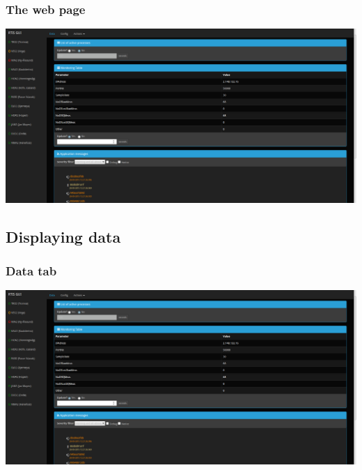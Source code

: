 \documentclass{beamer}
\begin{document}
\begin{frame}
\frametitle{The web page}

\begin{center}
	\hspace*{-5mm}
	\includegraphics[width=\paperwidth]{images/dataTab}
\end{center}

\end{frame}

\subsection{Displaying data}
\begin{frame}
\frametitle{Data tab}
	\hspace*{-5mm}
	\includegraphics[width=\paperwidth]{images/dataTab}
\end{frame}
\end{document}
